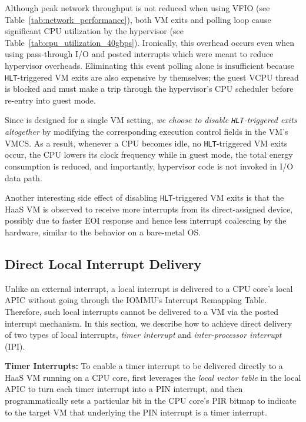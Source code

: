 Although peak network throughput is not reduced when
using VFIO (see Table~\ref{tab:network_performance}),
both VM exits and polling loop cause significant
CPU utilization by the hypervisor
(see Table~\ref{tab:cpu_utilization_40gbps}).
Ironically, this overhead occurs even when using pass-through I/O and
posted interrupts which were meant to reduce hypervisor overheads.
Eliminating this event polling alone is insufficient because {\tt HLT}-triggered VM exits
are also expensive by themselves; the guest VCPU thread is blocked and
must make a trip through the hypervisor's CPU scheduler before
re-entry into guest mode.

Since \na is designed for a single VM setting, {\em we choose to
disable {\tt HLT}-triggered exits altogether}
by modifying the corresponding execution control fields in the VM's VMCS.
As a result, whenever a CPU becomes idle, no {\tt HLT}-triggered
VM exits occur, the CPU lowers its clock frequency while in guest mode,
the total energy consumption is reduced, and importantly,
hypervisor code is not invoked in I/O data path.

Another interesting side effect of disabling {\tt HLT}-triggered VM exits
is that the HaaS VM is observed to receive more interrupts
from its direct-assigned device, possibly due to
faster EOI response and hence less interrupt coalescing by
the hardware, similar to the behavior on a bare-metal OS.

\subsection{Direct Local Interrupt Delivery}
\label{subsubsec:shared_pid_dtid}

Unlike an external interrupt, a local interrupt is delivered to a CPU core's local APIC without going through the IOMMU's Interrupt Remapping Table.
Therefore, such local interrupts cannot be delivered to a VM via the posted interrupt mechanism.
In this section, we describe how to achieve direct delivery of two types of local interrupts, {\em timer interrupt} and {\em inter-processor interrupt} (IPI).

{\bf Timer Interrupts:} To enable a timer interrupt to be delivered directly to a HaaS VM running on a CPU core,
\na first leverages the {\em local vector table} in the local APIC to turn each timer interrupt into a PIN interrupt, and
then programmatically sets a particular bit in the CPU core's PIR bitmap to indicate to the target VM that underlying the PIN interrupt is a timer interrupt.

